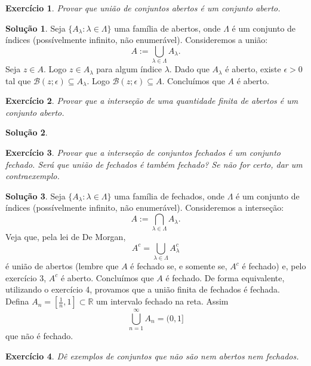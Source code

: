 \documentclass[a4paper,12pt]{article}
\newcommand{\R}{\mathbb{R}}
\newcommand{\B}{\mathcal{B}}
\theoremstyle{exer}
\newtheorem{exercise}{Exercício}
\theoremstyle{definition}
\newtheorem{solution}{Solução}
\theoremstyle{plain}
\begin{document}
\begin{exercise}
    Provar que união de conjuntos abertos é um conjunto aberto.
\end{exercise}

\begin{solution}
    Seja $\{A_{\lambda} : \lambda \in \Lambda\}$ uma família de abertos, onde
    $\Lambda$ é um conjunto de índices (possívelmente infinito, não
    enumerável). Consideremos a união:
    $$
    A := \bigcup_{\lambda \in \Lambda} A_{\lambda}.
    $$
    Seja $z \in A$. Logo $z \in A_{\lambda}$ para algum índice $\lambda$. Dado
    que $A_{\lambda}$ é aberto, existe $\epsilon > 0$ tal que $\B(z; \epsilon)
    \subseteq A_{\lambda}$. Logo $\B(z; \epsilon) \subseteq A$. Concluímos que $A$ é aberto.
\end{solution}

\begin{exercise}
    Provar que a interseção de uma quantidade finita de abertos é um conjunto aberto.
\end{exercise}

\begin{solution}

\end{solution}

\begin{exercise}
    Provar que a interseção de conjuntos fechados é um conjunto fechado. Será que união de fechados é também fechado? Se não for certo, dar um contraexemplo.
\end{exercise}

\begin{solution}
    Seja $\{A_{\lambda} : \lambda \in \Lambda\}$ uma família de fechados, onde
    $\Lambda$ é um conjunto de índices (possívelmente infinito, não
    enumerável). Consideremos a interseção:
    $$
    A := \bigcap_{\lambda \in \Lambda} A_{\lambda}.
    $$
    Veja que, pela lei de De Morgan,
    $$
    A^c = \bigcup_{\lambda \in \Lambda} A_{\lambda}^c
    $$
    é união de abertos (lembre que $A$ é fechado se, e somente se, $A^c$ é
    fechado) e, pelo exercício 3, $A^c$ é aberto. Concluímos que $A$ é
    fechado. De forma equivalente, utilizando o exercício 4, provamos que a
    união finita de fechados é fechada. Defina $A_n = \left[\frac{1}{n}, 1\right] \subset \R$ um intervalo fechado
    na reta. Assim 
    $$
    \bigcup_{n=1}^{\infty} A_n = (0,1]
    $$
    que não é fechado. 
\end{solution}

\begin{exercise}
    Dê exemplos de conjuntos que não são nem abertos nem fechados.
\end{exercise}
\end{document}
